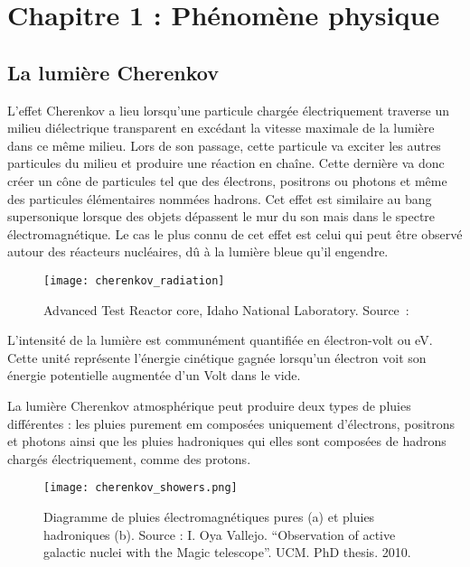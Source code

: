 \chapter{Chapitre 1 : Phénomène physique}


\section{La lumière Cherenkov}

L'effet Cherenkov a lieu lorsqu'une particule chargée électriquement traverse un milieu diélectrique transparent
en excédant la vitesse maximale de la lumière dans ce même milieu. 
Lors de son passage, cette particule va exciter les autres particules du milieu et produire une réaction en chaîne.
Cette dernière va donc créer un cône de particules tel que des électrons, positrons ou photons et même des particules élémentaires nommées hadrons.
Cet effet est similaire au bang supersonique lorsque des objets dépassent le mur du son mais dans le spectre électromagnétique.
Le cas le plus connu de cet effet est celui qui peut être observé autour des réacteurs nucléaires, dû à la lumière bleue qu'il engendre.

\begin{figure}[tbph!]
	\centering
	\texttt{[image: cherenkov\_radiation]}
	\caption[Advanced Test Reactor core, Idaho National Laboratory]{Advanced Test Reactor core, Idaho National Laboratory. Source : \cite{CherenkovRadiation}}
\end{figure}

L'intensité de la lumière est communément quantifiée en électron-volt ou eV.
Cette unité représente l'énergie cinétique gagnée lorsqu'un électron voit son énergie potentielle augmentée d'un Volt dans le vide.

La lumière Cherenkov atmosphérique peut produire deux types de pluies différentes : les pluies purement \gls{em}
composées uniquement d'électrons, positrons et photons ainsi que les pluies hadroniques qui elles sont composées de hadrons chargés électriquement, comme des protons.

\begin{figure}[tbph!]
	\centering
	\texttt{[image: cherenkov\_showers.png]}
	\caption[Diagramme de pluies EM et hadroniques]{Diagramme de pluies électromagnétiques pures (a) et pluies hadroniques (b). Source : I. Oya Vallejo. “Observation of active galactic nuclei with the Magic telescope”. UCM. PhD thesis. 2010.}
\end{figure}

